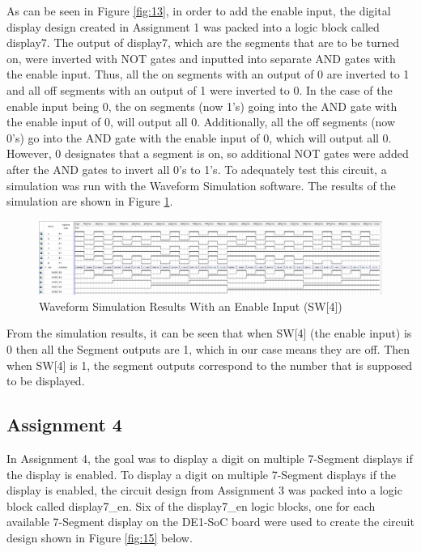 \documentclass[
	letterpaper, %
	10pt, %
]{CSUniSchoolLabReport}
\begin{document}
\hspace{.5 in} As can be seen in Figure \ref{fig:13}, in order to add the enable input, the digital display design created in Assignment 1 was packed into a logic block called display7. The output of display7, which are the segments that are to be turned on, were inverted with NOT gates and inputted into separate AND gates with the enable input. Thus, all the on segments with an output of 0 are inverted to 1 and all off segments with an output of 1 were inverted to 0. In the case of the enable input being 0, the on segments (now 1’s) going into the AND gate with the enable input of 0, will output all 0. Additionally, all the off segments (now 0’s) go into the AND gate with the enable input of 0, which will output all 0. However, 0 designates that a segment is on, so additional NOT gates were added after the AND gates to invert all 0’s to 1’s. To adequately test this circuit, a simulation was run with the Waveform Simulation software. The results of the simulation are shown in Figure \ref{fig:14}.

\begin{figure}[H]
  \centering
  \includegraphics[width=.9\textwidth]{Figures/Sim_en.png}
  \caption{Waveform Simulation Results With an Enable Input (SW[4])}
  \label{fig:14}
\end{figure}

From the simulation results, it can be seen that when SW[4] (the enable input) is 0 then all the Segment outputs are 1, which in our case means they are off. Then when SW[4] is 1, the segment outputs correspond to the number that is supposed to be displayed. 

\subsection{Assignment 4}

In Assignment 4, the goal was to display a digit on multiple 7-Segment displays if the display is enabled. To display a digit on multiple 7-Segment displays if the display is enabled, the circuit design from Assignment 3 was packed into a logic block called display7\_en. Six of the display7\_en logic blocks, one for each available 7-Segment display on the DE1-SoC board were used to create the circuit design shown in Figure \ref{fig:15} below. 
\end{document}
